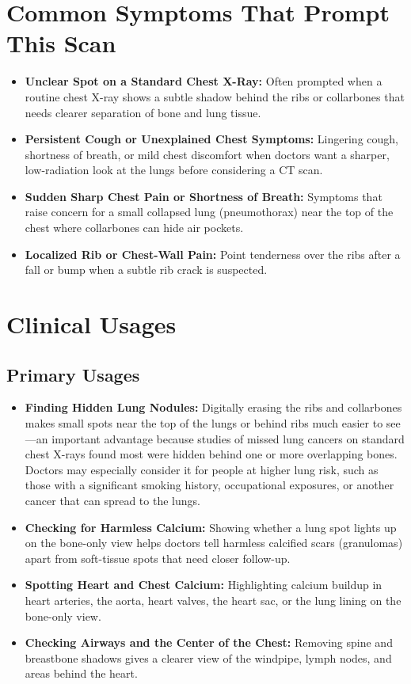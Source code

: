 \section{Common Symptoms That Prompt This Scan}
\begin{itemize}
    \item \textbf{Unclear Spot on a Standard Chest X-Ray:} Often prompted when a routine chest X-ray shows a subtle shadow behind the ribs or collarbones that needs clearer separation of bone and lung tissue.
    \item \textbf{Persistent Cough or Unexplained Chest Symptoms:} Lingering cough, shortness of breath, or mild chest discomfort when doctors want a sharper, low-radiation look at the lungs before considering a CT scan.
    \item \textbf{Sudden Sharp Chest Pain or Shortness of Breath:} Symptoms that raise concern for a small collapsed lung (pneumothorax) near the top of the chest where collarbones can hide air pockets.
    \item \textbf{Localized Rib or Chest-Wall Pain:} Point tenderness over the ribs after a fall or bump when a subtle rib crack is suspected.
\end{itemize}

\section{Clinical Usages}

\subsection{Primary Usages}
\begin{itemize}
    \item \textbf{Finding Hidden Lung Nodules:} Digitally erasing the ribs and collarbones makes small spots near the top of the lungs or behind ribs much easier to see---an important advantage because studies of missed lung cancers on standard chest X-rays found most were hidden behind one or more overlapping bones. Doctors may especially consider it for people at higher lung risk, such as those with a significant smoking history, occupational exposures, or another cancer that can spread to the lungs.
    \item \textbf{Checking for Harmless Calcium:} Showing whether a lung spot lights up on the bone-only view helps doctors tell harmless calcified scars (granulomas) apart from soft-tissue spots that need closer follow-up.
    \item \textbf{Spotting Heart and Chest Calcium:} Highlighting calcium buildup in heart arteries, the aorta, heart valves, the heart sac, or the lung lining on the bone-only view.
    \item \textbf{Checking Airways and the Center of the Chest:} Removing spine and breastbone shadows gives a clearer view of the windpipe, lymph nodes, and areas behind the heart.
\end{itemize}

